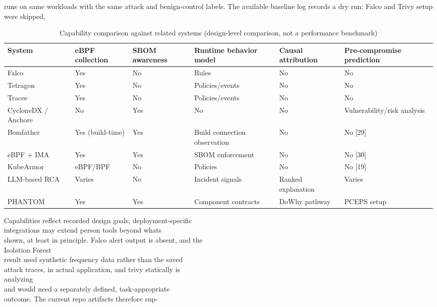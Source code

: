 \documentclass[conference]{IEEEtran}
\begin{document}
runs on same workloads with the same attack and benign-control labels. The available baseline log records a dry run: Falco and Trivy setup were skipped,

\par\begin{table}[t]
\centering\footnotesize
\caption{Capability comparison against related systems (design-level comparison, not a performance benchmark)}
\label{tab:capability-comparison}
\begin{tabularx}{\textwidth}{@{}lXXXXX@{}}
\toprule
System & eBPF collection & SBOM awareness & Runtime behavior model & Causal attribution & Pre-compromise prediction \\
\midrule
Falco & Yes & No & Rules & No & No \\
Tetragon & Yes & No & Policies/events & No & No \\
Tracee & Yes & No & Policies/events & No & No \\
CycloneDX / Anchore & No & Yes & No & No & Vulnerability/risk analysis \\
Bomfather & Yes (build-time) & Yes & Build connection observation & No & No {[}29{]} \\
eBPF + IMA & Yes & Yes & SBOM enforcement & No & No {[}30{]} \\
KubeArmor & eBPF/BPF & No & Policies & No & No {[}19{]} \\
LLM-based RCA & Varies & No & Incident signals & Ranked explanation & Varies \\
PHANTOM & Yes & Yes & Component contracts & DoWhy pathway & PCEPS setup \\
\bottomrule
\end{tabularx}
\end{table}
Capabilities reflect recorded design goals; deployment-specific\\
integrations may extend person tools beyond what\textquotesingle s\\
shown, at least in principle. Falco alert output is absent, and the\\
Isolation Forest\\
result used synthetic frequency data rather than the saved\\
attack traces, in actual application, and trivy statically is\\
analyzing\\
and would need a separately defined, task-appropriate\\
outcome. The current repo artifacts therefore sup-\\
\end{document}
